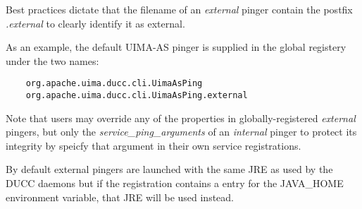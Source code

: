    Best practices dictate that the filename of an {\em external} pinger contain the
    postfix {\em .external} to clearly identify it as external.  

    As an example, the default UIMA-AS pinger is supplied in the global registery
    under the two names:
\begin{verbatim}
    org.apache.uima.ducc.cli.UimaAsPing
    org.apache.uima.ducc.cli.UimaAsPing.external
\end{verbatim}

    Note that users may override any of the properties in globally-registered
    {\em external} pingers, but only the {\em service\_ping\_arguments} of an {\em internal}
    pinger to protect its integrity by speicfy that argument in their own
    service registrations.

    By default external pingers are launched with the same JRE as used by the DUCC daemons but if the
    registration contains a entry for the JAVA\_HOME environment variable, that JRE will be used instead.

